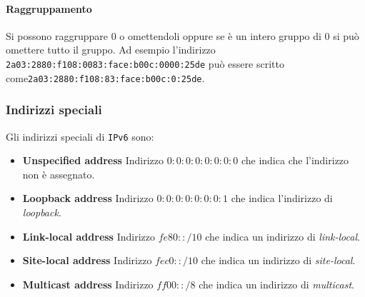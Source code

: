             \paragraph{Raggruppamento} Si possono raggruppare $0$ o omettendoli oppure se è un intero gruppo di $0$ si può omettere tutto il gruppo. Ad esempio l'indirizzo \texttt{2a03:2880:f108:0083:face:b00c:0000:25de} può essere scritto come\texttt{2a03:2880:f108:83:face:b00c:0:25de}. 
        \subsubsection{Indirizzi speciali}
            Gli indirizzi speciali di \texttt{IPv6} sono: \begin{itemize}
                \item \textbf{Unspecified address} Indirizzo $0:0:0:0:0:0:0:0$ che indica che l'indirizzo non è assegnato.
                \item \textbf{Loopback address} Indirizzo $0:0:0:0:0:0:0:1$ che indica l'indirizzo di \textit{loopback}.
                \item \textbf{Link-local address} Indirizzo $fe80::/10$ che indica un indirizzo di \textit{link-local}.
                \item \textbf{Site-local address} Indirizzo $fec0::/10$ che indica un indirizzo di \textit{site-local}.
                \item \textbf{Multicast address} Indirizzo $ff00::/8$ che indica un indirizzo di \textit{multicast}.
            \end{itemize}
        